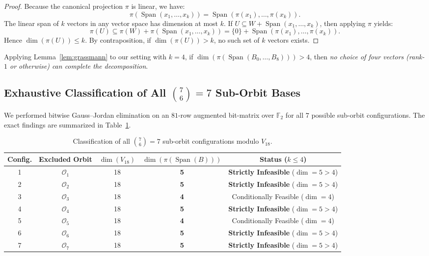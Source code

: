 \documentclass[11pt,reqno]{amsart}
\theoremstyle{plain}
\theoremstyle{definition}
\begin{document}
\begin{proof}
Because the canonical projection $\pi$ is linear, we have:
\begin{equation}
\pi(\operatorname{Span}(x_1, \dots, x_k)) = \operatorname{Span}(\pi(x_1), \dots, \pi(x_k)).
\end{equation}
The linear span of $k$ vectors in any vector space has dimension at most $k$. If $U \subseteq W + \operatorname{Span}(x_1, \dots, x_k)$, then applying $\pi$ yields:
\begin{equation}
\pi(U) \subseteq \pi(W) + \pi(\operatorname{Span}(x_1, \dots, x_k)) = \{0\} + \operatorname{Span}(\pi(x_1), \dots, \pi(x_k)).
\end{equation}
Hence $\dim(\pi(U)) \le k$. By contraposition, if $\dim(\pi(U)) > k$, no such set of $k$ vectors exists.
\end{proof}

Applying Lemma~\ref{lem:grassmann} to our setting with $k = 4$, if $\dim(\pi(\operatorname{Span}(B_0, \dots, B_8))) > 4$, then \emph{no choice of four vectors (rank-$1$ or otherwise) can complete the decomposition}.

\subsection{Exhaustive Classification of All $\binom{7}{6} = 7$ Sub-Orbit Bases}

We performed bitwise Gauss--Jordan elimination on an $81$-row augmented bit-matrix over $\mathbb{F}_2$ for all $7$ possible sub-orbit configurations. The exact findings are summarized in Table~\ref{tab:suborbits}.

\begin{table}[htbp]
\centering
\caption{Classification of all $\binom{7}{6} = 7$ sub-orbit configurations modulo $V_{18}$.}
\label{tab:suborbits}
\vspace{-2mm}
\begin{tabular}{ccccc}
\toprule
Config. & Excluded Orbit & $\dim(V_{18})$ & $\dim(\pi(\operatorname{Span}(B)))$ & Status ($k \le 4$) \\
\midrule
1 & $\mathcal{O}_1$ & 18 & \textbf{5} & \textbf{Strictly Infeasible} ($\dim = 5 > 4$) \\
2 & $\mathcal{O}_2$ & 18 & \textbf{5} & \textbf{Strictly Infeasible} ($\dim = 5 > 4$) \\
3 & $\mathcal{O}_3$ & 18 & \textbf{4} & Conditionally Feasible ($\dim = 4$) \\
4 & $\mathcal{O}_4$ & 18 & \textbf{5} & \textbf{Strictly Infeasible} ($\dim = 5 > 4$) \\
5 & $\mathcal{O}_5$ & 18 & \textbf{4} & Conditionally Feasible ($\dim = 4$) \\
6 & $\mathcal{O}_6$ & 18 & \textbf{5} & \textbf{Strictly Infeasible} ($\dim = 5 > 4$) \\
7 & $\mathcal{O}_7$ & 18 & \textbf{5} & \textbf{Strictly Infeasible} ($\dim = 5 > 4$) \\
\bottomrule
\end{tabular}
\end{table}
\end{document}
